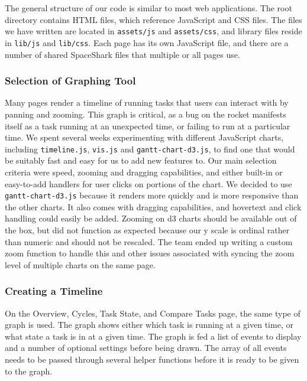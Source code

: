 \documentclass{hmcclinic}
\begin{document}
  The general structure of our code is similar to most web applications. 
  The root directory contains HTML files, which reference JavaScript and CSS files. The files
  we have written are located in \texttt{assets/js} and \texttt{assets/css}, and
  library files reside in \texttt{lib/js} and \texttt{lib/css}.  Each page has
  its own JavaScript file, and there are a number of shared SpaceShark files that
  multiple or all pages use.
  
  \subsubsection{Selection of Graphing Tool} %
  Many pages render a timeline of running tasks that users can interact
  with by panning and zooming. This graph is critical, as a bug on the rocket manifests
  itself as a task running at an unexpected time, or failing to run at a
  particular time. We spent several weeks experimenting with different
  JavaScript charts, including \texttt{timeline.js}, \texttt{vis.js} and
  \texttt{gantt-chart-d3.js},
  to find one that would be suitably fast and easy for us to add new
  features to. Our main selection criteria were speed, zooming and dragging
  capabilities, and either built-in or easy-to-add handlers for user clicks
  on portions of the chart. We decided to use \texttt{gantt-chart-d3.js} because it
  renders more quickly and is more responsive than the other charts. It
  also comes with dragging capabilities, and hovertext and
  click handling could easily be added. Zooming on d3 charts should be
  available out of the box, but did not function as expected because our y scale
  is ordinal rather than numeric and should not be rescaled. The team
  ended up writing a custom zoom function to handle this and other issues
  associated with syncing the zoom level of multiple charts on the same page.
  
  \subsubsection{Creating a Timeline}
  On the Overview, Cycles, Task State, and Compare Tasks page, the same type of
  graph is used. The graph shows either which task is running at a given time,
  or what state a task is in at a given time. The graph is fed a list of
  events to display and a number of optional settings before being drawn. The
  array of all events needs to be passed through several helper functions
  before it is ready to be given to the graph.
  
\end{document}
